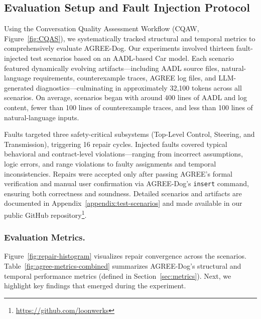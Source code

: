 

\subsection{Evaluation Setup and Fault Injection Protocol}

Using the Conversation Quality Assessment Workflow (CQAW, Figure~\ref{fig:CQAS}), we systematically tracked structural and temporal metrics to comprehensively evaluate AGREE-Dog. Our experiments involved thirteen fault-injected test scenarios based on an AADL-based Car model. Each scenario featured dynamically evolving artifacts—including AADL source files, natural-language requirements, counterexample traces, AGREE log files, and LLM-generated diagnostics—culminating in approximately 32,100 tokens across all scenarios. On average, scenarios began with around 400 lines of AADL and log content, fewer than 100 lines of counterexample traces, and less than 100 lines of natural-language inputs.

Faults targeted three safety-critical subsystems (Top-Level Control, Steering, and Transmission), triggering 16 repair cycles. Injected faults covered typical behavioral and contract-level violations—ranging from incorrect assumptions, logic errors, and range violations to faulty assignments and temporal inconsistencies. Repairs were accepted only after passing AGREE's formal verification and manual user confirmation via AGREE-Dog’s \texttt{insert} command, ensuring both correctness and soundness. Detailed scenarios and artifacts are documented in Appendix~\ref{appendix:test-scenarios} and made available in our public GitHub repository\footnote{\url{https://github.com/loonwerks}}.




\subsubsection*{Evaluation Metrics.}
Figure~\ref{fig:repair-histogram} visualizes repair convergence across the scenarios. Table~\ref{fig:agree-metrics-combined} summarizes AGREE-Dog’s structural and temporal performance metrics (defined in Section~\ref{sec:metrics}).  Next, we highlight key findings that emerged during the experiment.
